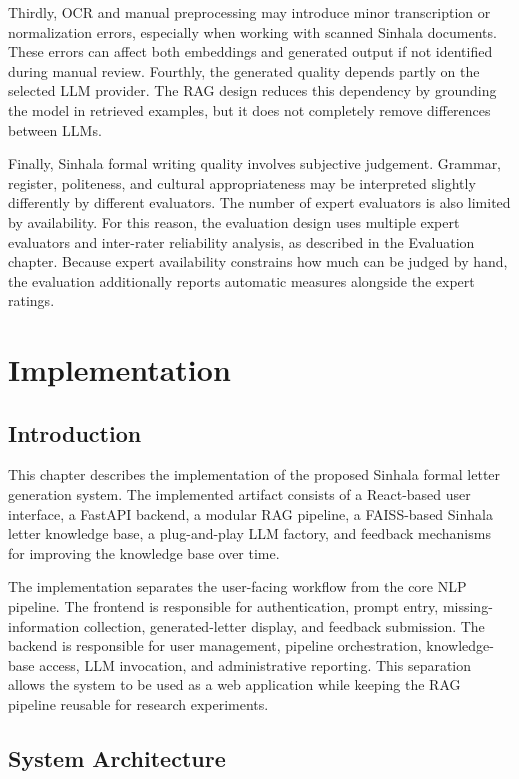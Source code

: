 \documentclass[12pt]{uomthesis}
\begin{document}
Thirdly, OCR and manual preprocessing may introduce minor transcription or normalization errors, especially when working with scanned Sinhala documents. These errors can affect both embeddings and generated output if not identified during manual review. Fourthly, the generated quality depends partly on the selected LLM provider. The RAG design reduces this dependency by grounding the model in retrieved examples, but it does not completely remove differences between LLMs.

Finally, Sinhala formal writing quality involves subjective judgement. Grammar, register, politeness, and cultural appropriateness may be interpreted slightly differently by different evaluators. The number of expert evaluators is also limited by availability. For this reason, the evaluation design uses multiple expert evaluators and inter-rater reliability analysis, as described in the Evaluation chapter. Because expert availability constrains how much can be judged by hand, the evaluation additionally reports automatic measures alongside the expert ratings.


\chapter{Implementation}

\section{Introduction}

This chapter describes the implementation of the proposed Sinhala formal letter generation system. The implemented artifact consists of a React-based user interface, a FastAPI backend, a modular RAG pipeline, a FAISS-based Sinhala letter knowledge base, a plug-and-play LLM factory, and feedback mechanisms for improving the knowledge base over time.

The implementation separates the user-facing workflow from the core NLP pipeline. The frontend is responsible for authentication, prompt entry, missing-information collection, generated-letter display, and feedback submission. The backend is responsible for user management, pipeline orchestration, knowledge-base access, LLM invocation, and administrative reporting. This separation allows the system to be used as a web application while keeping the RAG pipeline reusable for research experiments.

\section{System Architecture}
\end{document}

